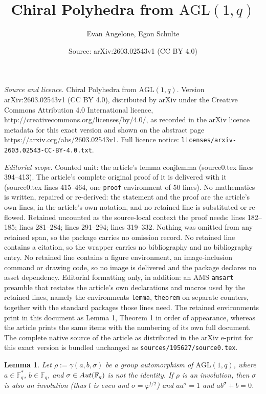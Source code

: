 \documentclass[10pt,a4paper]{amsart}
\title{Chiral Polyhedra from $\mathrm{AGL}(1,q)$}
\author{Evan Angelone, Egon Schulte}
\date{Source: arXiv:2603.02543v1 (CC BY 4.0)}
\newtheorem{lemma}{Lemma}
\begin{document}
\maketitle

\noindent\emph{Source and licence.} Chiral Polyhedra from $\mathrm{AGL}(1,q)$. Version arXiv:2603.02543v1 (CC BY 4.0), distributed by arXiv under the Creative Commons Attribution 4.0 International licence, http://creativecommons.org/licenses/by/4.0/, as recorded in the arXiv licence metadata for this exact version and shown on the abstract page https://arxiv.org/abs/2603.02543v1. Full licence notice: \texttt{licenses/arxiv-2603.02543-CC-BY-4.0.txt}.\par\smallskip

\noindent\textit{Editorial scope.} Counted unit: the article's lemma conjlemma (source0.tex lines 394--413). The article's complete original proof of it is delivered with it (source0.tex lines 415--464, one \texttt{proof} environment of 50 lines). No mathematics is written, repaired or re-derived: the statement and the proof are the article's own lines, in the article's own notation, and no retained line is substituted or re-flowed.  Retained uncounted as the source-local context the proof needs: lines 182--185; lines 281--284; lines 291--294; lines 319--332.  Nothing was omitted from any retained span, so the package carries no omission record.  No retained line contains a citation, so the wrapper carries no bibliography and no bibliography entry.  No retained line contains a figure environment, an image-inclusion command or drawing code, so no image is delivered and the package declares no asset dependency.  Editorial formatting only, in addition: an AMS \texttt{amsart} preamble that restates the article's own declarations and macros used by the retained lines, namely the environments \texttt{lemma}, \texttt{theorem} on separate counters, together with the standard packages those lines need.  The retained environments print in this document as Lemma 1, Theorem 1 in order of appearance, whereas the article prints the same items with the numbering of its own full document.  The complete native source of the article as distributed in the arXiv e-print for this exact version is bundled unchanged as \texttt{sources/195627/source0.tex}.
\begin{lemma}
\label{invgrauts}
Let $\rho:=\gamma(a,b,\sigma)$ be a group automorphism of $\mathrm{AGL}(1,q)$, where $a\in\mathbb{F}_q^*$, $b\in\mathbb{F}_q$, and $\sigma\in\rm{Aut}(\mathbb{F}_q)$ is not the identity. If $\rho$ is an involution, then $\sigma$ is also an involution (thus $l$ is even and $\sigma=\varphi^{l/2}$)
and $aa^{\sigma} = 1$ and $ab^\sigma +b=0$. \end{lemma}
\end{document}
